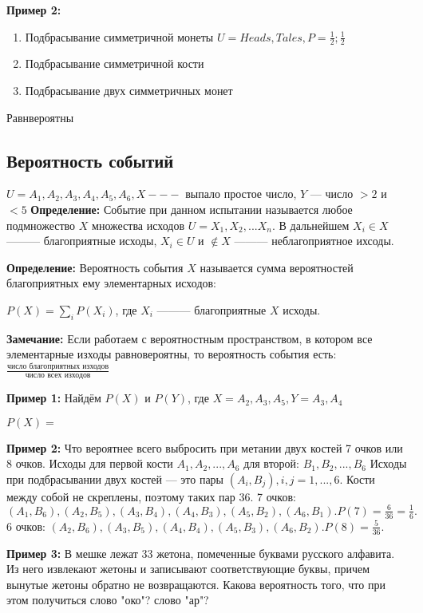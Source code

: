 \documentclass{article}
\begin{document}
    \textbf{Пример 2:}
    \begin{enumerate}
        \item Подбрасывание симметричной монеты \(U = {Heads, Tales}, P = {\frac{1}{2}; \frac{1}{2}}\)
        \item Подбрасывание симметричной кости %
        \item Подбрасывание двух симметричных монет %
    \end{enumerate}

    Равнвероятны %
    

    \subsection*{Вероятность событий} %

    \(U = {A_1, A_2, A_3, A_4, A_5, A_6}, X ---\) выпало простое число, $Y$ --- число $>2$ и $<5$
    \textbf{Определение:}
    Событие при данном испытании называется любое подмножество $X$ множества исходов \(U = {X_1, X_2, ... X_n}\).
    В дальнейшем \(X_i \in X\) ——— благоприятные исходы, \(X_i \in U\) и $\notin X$ ——— неблагоприятное ихсоды.

    \textbf{Определение:}
    Вероятность события $X$ называется сумма вероятностей благоприятных ему элементарных исходов:
    
    \(P(X) = \sum_{i} P(X_i)\), где $X_i$ ——— благоприятные $X$ исходы.

    \textbf{Замечание:} Если работаем с вероятностным пространством, в котором все элементарные изходы равновероятны, то вероятность события есть:
    \( \frac{ \textrm{число благоприятных изходов} }{ \textrm{число всех изходов} }\)

    \textbf{Пример 1:}
    Найдём $P(X)$ и $P(Y)$, где \(X = {A_2, A_3, A_5}, Y = {A_3, A_4}\)

    \(P(X) = \)

    \textbf{Пример 2:} Что вероятнее всего выбросить при метании двух костей 7 очков или 8 очков.
    Исходы для первой кости \(A_1, A_2, ..., A_6\) для второй: \(B_1, B_2, ..., B_6\)
    Исходы при подбрасывании двух костей --- это пары \((A_i, B_j), i, j = 1, ... , 6.\) Кости между собой не скреплены, поэтому таких пар 36.
    7 очков:  \( (A_1, B_6), (A_2, B_5), (A_3, B_4), (A_4, B_3), (A_5, B_2), (A_6, B_1). P(7) = \frac{6}{36} = \frac{1}{6}.\)
    6 очков:  \( (A_2, B_6), (A_3, B_5), (A_4, B_4), (A_5, B_3), (A_6, B_2). P(8) = \frac{5}{36}.\)


    \textbf{Пример 3:} 
    В мешке лежат 33 жетона, помеченные буквами русского алфавита.
    Из него извлекают жетоны и записывают соответствующие буквы, 
    причем вынутые жетоны обратно не возвращаются. 
    Какова вероятность того, что при этом получиться слово "око"? слово "ар"?
\end{document}
